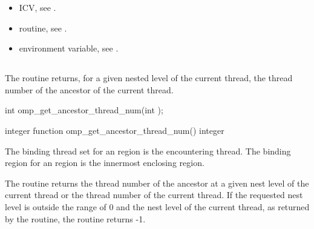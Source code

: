 \crossreferences
\begin{itemize}
\item {} ICV, see 
.

\item {} routine, see 
.

\item {} environment variable, see 
.
\end{itemize}










\subsection{}
\label{subsec:omp_get_ancestor_thread_num}
\summary
The  routine returns, for a given nested level of 
the current thread, the thread number of the ancestor of the current thread.

\begin{samepage}
\format
\ccppspecificstart
\begin{boxedcode}
int omp\_get\_ancestor\_thread\_num(int );
\end{boxedcode}
\ccppspecificend
\end{samepage}

\fortranspecificstart
\begin{boxedcode}
integer function omp\_get\_ancestor\_thread\_num()
integer 
\end{boxedcode}
\fortranspecificend

\binding
The binding thread set for an  region is the 
encountering thread. The binding region for an  
region is the innermost enclosing  region. 

\effect
The  routine returns the thread number of the 
ancestor at a given nest level of the current thread or the thread number of the current 
thread. If the requested nest level is outside the range of 0 and the nest level of the 
current thread, as returned by the  routine, the routine returns -1.

